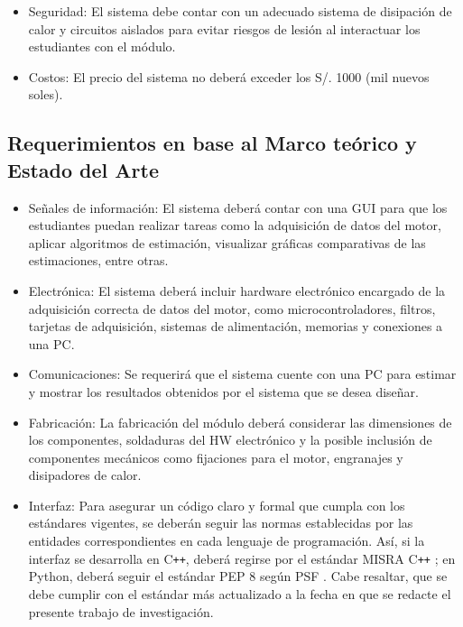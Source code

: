 \begin{itemize}
        \item Seguridad: 
        El sistema debe contar con un adecuado sistema de disipación de calor y circuitos aislados para evitar riesgos de lesión al interactuar los estudiantes con el módulo.
        
        \item Costos: 
        El precio del sistema no deberá exceder los S/. 1000 (mil nuevos soles).
    \end{itemize}
\subsection{Requerimientos en base al Marco teórico y Estado del Arte}
    \begin{itemize}
        \item Señales de información:  
       El sistema deberá contar con una \ac{GUI} para que los estudiantes puedan realizar tareas como la adquisición de datos del motor, aplicar algoritmos de estimación, visualizar gráficas comparativas de las estimaciones, entre otras.
       \item Electrónica: 
       El sistema deberá incluir hardware electrónico encargado de la adquisición correcta de datos del motor, como microcontroladores, filtros, tarjetas de adquisición, sistemas de alimentación, memorias y conexiones a una PC.
       \item Comunicaciones: 
       Se requerirá que el sistema cuente con una \ac{PC} para estimar y mostrar los resultados obtenidos por el sistema que se desea diseñar.
       \item Fabricación:
        La fabricación del módulo deberá considerar las dimensiones de los componentes, soldaduras del \ac{HW} electrónico y la posible inclusión de componentes mecánicos como fijaciones para el motor, engranajes y disipadores de calor.
        \item Interfaz:
        Para asegurar un código claro y formal que cumpla con los estándares vigentes, se deberán seguir las normas establecidas por las entidades correspondientes en cada lenguaje de programación. Así, si la interfaz se desarrolla en C\texttt{++}, deberá regirse por el estándar MISRA C\texttt{++} \autocite{MISRA_CPP_2023}; en Python, deberá seguir el estándar PEP 8 según PSF \autocite{PEP8_Guide}. Cabe resaltar,  que se debe cumplir con el estándar más actualizado a la fecha en que se redacte el presente trabajo de investigación.
    \end{itemize}


